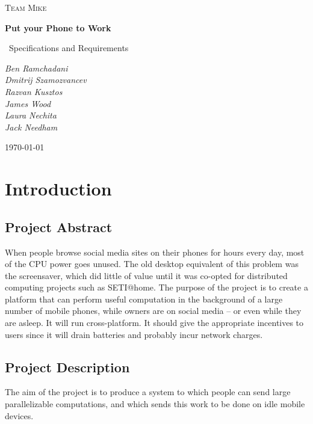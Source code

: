 \documentclass[a4paper,10pt]{article}
\title{}
\author{}
\date{}
\begin{document}
\begin{titlepage}
	\centering
	
	{\scshape\Large Team Mike\par}
	\vspace{4cm}
	{\huge\bfseries Put your Phone to Work\par}
	\vspace{1.5cm}
	{\Large\
	Specifications and Requirements
	\par}
	\vspace{2cm}
	{\Large\itshape 
	      Ben Ramchadani\\
	      Dmitrij Szamozvancev\\
	      Razvan Kusztos\\
	      James Wood \\
	      Laura Nechita \\
	      Jack Needham
	      \par}
	\vfill

	{\large \today\par}
\end{titlepage}
\maketitle
\tableofcontents
\newpage
\section{Introduction}

\subsection{Project Abstract}
When people browse social media sites on their phones for hours every day, most of the CPU power goes unused. The old desktop equivalent of this problem was the screensaver, which did little of value until it was co-opted for distributed computing projects such as SETI@home. The purpose of the project is to create a platform that can perform useful computation in the background of a large number of mobile phones, while owners are on social media – or even while they are asleep. It will run cross-platform. It should give the appropriate incentives to users since it will drain batteries and probably incur network charges. 

\subsection{Project Description}
The aim of the project is to produce a system to which people can send large parallelizable computations, and which sends this work to be done on idle mobile devices.
\end{document}

